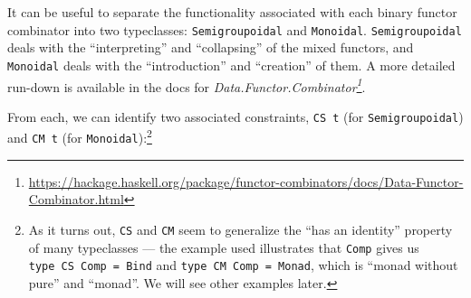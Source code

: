 \documentclass[]{article}
\renewcommand{\href}[2]{#2\footnote{\url{#1}}}
\begin{document}
It can be useful to separate the functionality associated with each binary
functor combinator into two typeclasses: \texttt{Semigroupoidal} and
\texttt{Monoidal}. \texttt{Semigroupoidal} deals with the ``interpreting'' and
``collapsing'' of the mixed functors, and \texttt{Monoidal} deals with the
``introduction'' and ``creation'' of them. A more detailed run-down is available
in the docs for
\emph{\href{https://hackage.haskell.org/package/functor-combinators/docs/Data-Functor-Combinator.html}{Data.Functor.Combinator}}.

From each, we can identify two associated constraints, \texttt{CS\ t} (for
\texttt{Semigroupoidal}) and \texttt{CM\ t} (for \texttt{Monoidal}):\footnote{As
  it turns out, \texttt{CS} and \texttt{CM} seem to generalize the ``has an
  identity'' property of many typeclasses --- the example used illustrates that
  \texttt{Comp} gives us \texttt{type\ CS\ Comp\ =\ Bind} and
  \texttt{type\ CM\ Comp\ =\ Monad}, which is ``monad without pure'' and
  ``monad''. We will see other examples later.}
\end{document}
